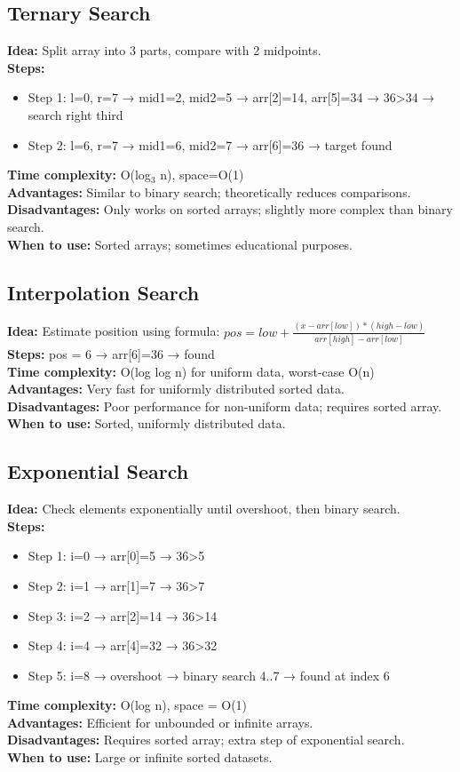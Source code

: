 \documentclass[a4paper,12pt]{article}
\begin{document}
\subsection{Ternary Search}
\textbf{Idea:} Split array into 3 parts, compare with 2 midpoints.  \\
\textbf{Steps:}
\begin{itemize}
  \item Step 1: l=0, r=7 → mid1=2, mid2=5 → arr[2]=14, arr[5]=34 → 36>34 → search right third
  \item Step 2: l=6, r=7 → mid1=6, mid2=7 → arr[6]=36 → target found
\end{itemize}
\textbf{Time complexity:} O(log$_3$ n), space=O(1)\\
\textbf{Advantages:} Similar to binary search; theoretically reduces comparisons.\\
\textbf{Disadvantages:} Only works on sorted arrays; slightly more complex than binary search.\\
\textbf{When to use:} Sorted arrays; sometimes educational purposes.

\subsection{Interpolation Search}
\textbf{Idea:} Estimate position using formula: $pos = low + \frac{(x-arr[low])*(high-low)}{arr[high]-arr[low]}$  \\
\textbf{Steps:} pos = 6 → arr[6]=36 → found  \\
\textbf{Time complexity:} O(log log n) for uniform data, worst-case O(n)\\
\textbf{Advantages:} Very fast for uniformly distributed sorted data.\\
\textbf{Disadvantages:} Poor performance for non-uniform data; requires sorted array.\\
\textbf{When to use:} Sorted, uniformly distributed data.
\subsection{Exponential Search}
\textbf{Idea:} Check elements exponentially until overshoot, then binary search.  \\
\textbf{Steps:}
\begin{itemize}
  \item Step 1: i=0 → arr[0]=5 → 36>5
  \item Step 2: i=1 → arr[1]=7 → 36>7
  \item Step 3: i=2 → arr[2]=14 → 36>14
  \item Step 4: i=4 → arr[4]=32 → 36>32
  \item Step 5: i=8 → overshoot → binary search 4..7 → found at index 6
\end{itemize}
\textbf{Time complexity:} O(log n), space = O(1)\\
\textbf{Advantages:} Efficient for unbounded or infinite arrays.\\
\textbf{Disadvantages:} Requires sorted array; extra step of exponential search.\\
\textbf{When to use:} Large or infinite sorted datasets.
\newpage
\end{document}

